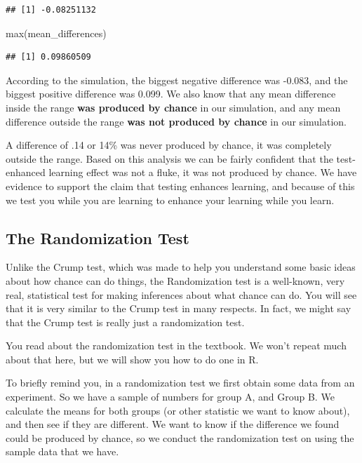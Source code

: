 \documentclass[
]{book}
\newenvironment{Shaded}{\begin{snugshade}}{\end{snugshade}}
\newcommand{\FunctionTok}[1]{\textcolor[rgb]{0.00,0.00,0.00}{#1}}
\newcommand{\NormalTok}[1]{#1}
\begin{document}
\begin{verbatim}
## [1] -0.08251132
\end{verbatim}

\begin{Shaded}
\begin{Highlighting}[]
\FunctionTok{max}\NormalTok{(mean\_differences)}
\end{Highlighting}
\end{Shaded}

\begin{verbatim}
## [1] 0.09860509
\end{verbatim}

According to the simulation, the biggest negative difference was -0.083, and the biggest positive difference was 0.099. We also know that any mean difference inside the range \textbf{was produced by chance} in our simulation, and any mean difference outside the range \textbf{was not produced by chance} in our simulation.

A difference of .14 or 14\% was never produced by chance, it was completely outside the range. Based on this analysis we can be fairly confident that the test-enhanced learning effect was not a fluke, it was not produced by chance. We have evidence to support the claim that testing enhances learning, and because of this we test you while you are learning to enhance your learning while you learn.

\hypertarget{the-randomization-test}{%
\subsection{The Randomization Test}\label{the-randomization-test}}

Unlike the Crump test, which was made to help you understand some basic ideas about how chance can do things, the Randomization test is a well-known, very real, statistical test for making inferences about what chance can do. You will see that it is very similar to the Crump test in many respects. In fact, we might say that the Crump test is really just a randomization test.

You read about the randomization test in the textbook. We won't repeat much about that here, but we will show you how to do one in R.

To briefly remind you, in a randomization test we first obtain some data from an experiment. So we have a sample of numbers for group A, and Group B. We calculate the means for both groups (or other statistic we want to know about), and then see if they are different. We want to know if the difference we found could be produced by chance, so we conduct the randomization test on using the sample data that we have.
\end{document}
